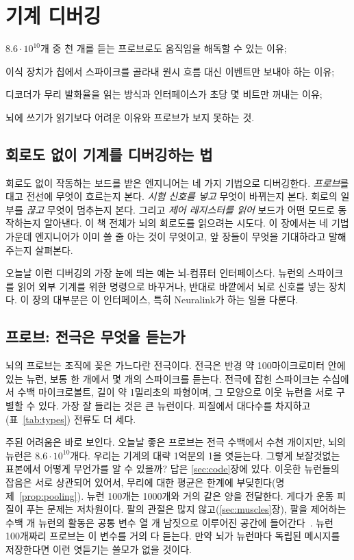\chapter{기계 디버깅}
\label{sec:debugging}
\begin{chaptergoals}
\item $8.6\cdot10^{10}$개 중 천 개를 듣는 프로브로도 움직임을 해독할 수 있는 이유;
\item 이식 장치가 칩에서 스파이크를 골라내 원시 흐름 대신 이벤트만 보내야 하는 이유;
\item 디코더가 무리 발화율을 읽는 방식과 인터페이스가 초당 몇 비트만 꺼내는 이유;
\item 뇌에 쓰기가 읽기보다 어려운 이유와 프로브가 보지 못하는 것.
\end{chaptergoals}

\section{회로도 없이 기계를 디버깅하는 법}

회로도 없이 작동하는 보드를 받은 엔지니어는 네 가지 기법으로 디버깅한다. \emph{프로브}를 대고 전선에 무엇이 흐르는지 본다. \emph{시험 신호를 넣고} 무엇이 바뀌는지 본다. 회로의 일부를 \emph{끊고} 무엇이 멈추는지 본다. 그리고 \emph{제어 레지스터를 읽어} 보드가 어떤 모드로 동작하는지 알아낸다. 이 책 전체가 뇌의 회로도를 읽으려는 시도다. 이 장에서는 네 기법 가운데 엔지니어가 이미 쓸 줄 아는 것이 무엇이고, 앞 장들이 무엇을 기대하라고 말해 주는지 살펴본다.

오늘날 이런 디버깅의 가장 눈에 띄는 예는 뇌-컴퓨터 인터페이스다. 뉴런의 스파이크를 읽어 외부 기계를 위한 명령으로 바꾸거나, 반대로 바깥에서 뇌로 신호를 넣는 장치다. 이 장의 대부분은 이 인터페이스, 특히 Neuralink가 하는 일을 다룬다.

\section{프로브: 전극은 무엇을 듣는가}

뇌의 프로브는 조직에 꽂은 가느다란 전극이다. 전극은 반경 약 100마이크로미터 안에 있는 뉴런, 보통 한 개에서 몇 개의 스파이크를 듣는다. 전극에 잡힌 스파이크는 수십에서 수백 마이크로볼트, 길이 약 1밀리초의 파형이며, 그 모양으로 이웃 뉴런을 서로 구별할 수 있다. 가장 잘 들리는 것은 큰  뉴런이다. 피질에서 대다수를 차지하고(표~\ref{tab:types}) 전류도 더 세다.

주된 어려움은 바로 보인다. 오늘날 좋은 프로브는 전극 수백에서 수천 개이지만, 뇌의 뉴런은 $8.6\cdot10^{10}$개다. 우리는 기계의 대략 1억분의 1을 엿듣는다. 그렇게 보잘것없는 표본에서 어떻게 무언가를 알 수 있을까? 답은 \ref{sec:code}장에 있다. 이웃한 뉴런들의 잡음은 서로 상관되어 있어서, 무리에 대한 평균은 한계에 부딪힌다(명제~\ref{prop:pooling}). 뉴런 100개는 1000개와 거의 같은 양을 전달한다. 게다가 운동 피질이 푸는 문제는 저차원이다. 팔의 관절은 많지 않고(\ref{sec:muscles}장), 팔을 제어하는 수백 개 뉴런의 활동은 공통 변수 열 개 남짓으로 이루어진 공간에 들어간다~\cite{Gallego2017}. 뉴런 100개짜리 프로브는 이 변수를 거의 다 듣는다. 만약 뇌가 뉴런마다 독립된 메시지를 저장한다면 이런 엿듣기는 쓸모가 없을 것이다.

